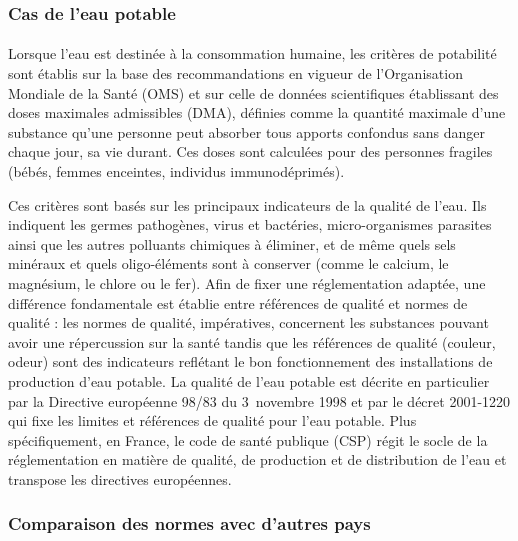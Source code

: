 \documentclass{article}
\begin{document}
\subsubsection{Cas de l’eau potable} 

\paragraph{} Lorsque l’eau est destinée à la consommation humaine, les critères de potabilité sont établis sur la base des recommandations en vigueur de l’Organisation Mondiale de la Santé (OMS) et sur celle de données scientifiques établissant des doses maximales admissibles (DMA), définies comme la quantité maximale d’une substance qu’une personne peut absorber tous apports confondus sans danger chaque jour, sa vie durant. Ces doses sont calculées pour des personnes fragiles (bébés, femmes enceintes, individus immunodéprimés).

Ces critères sont basés sur les principaux indicateurs de la qualité de l’eau. Ils indiquent les germes pathogènes, virus et bactéries, micro-organismes parasites ainsi que les autres polluants chimiques à éliminer, et de même quels sels minéraux et quels oligo-éléments sont à conserver (comme le calcium, le magnésium, le chlore ou le fer). Afin de fixer une réglementation adaptée, une différence fondamentale est établie entre références de qualité et normes de qualité : les normes de qualité, impératives, concernent les substances pouvant avoir une répercussion sur la santé tandis que les références de qualité (couleur, odeur) sont des indicateurs reflétant le bon fonctionnement des installations de production d’eau potable.
La qualité de l’eau potable est décrite en particulier par la Directive européenne 98/83 du 3~novembre 1998 et par le décret 2001-1220 qui fixe les limites et références de qualité pour l’eau potable. Plus spécifiquement, en France, le code de santé publique (CSP) régit le socle de la réglementation en matière de qualité, de production et de distribution de l’eau et transpose les directives européennes.

\subsubsection{Comparaison des normes avec d’autres pays}

\end{document}
